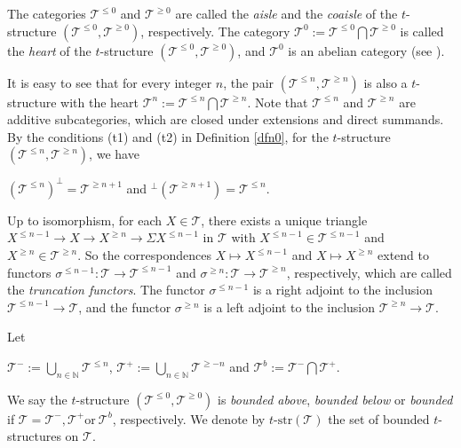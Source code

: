 \documentclass[11pt,a4paper]{amsart}
\numberwithin{equation}{section} \theoremstyle{plain}
\numberwithin{equation}{section} \theoremstyle{definition}
\begin{document}
The categories $\mathcal{T}^{\leq0}$ and $\mathcal{T}^{\geq0}$ are called the \emph{aisle} and the \emph{coaisle} of the $t$-structure $(\mathcal{T}^{\leq0},\mathcal{T}^{\geq0})$, respectively.  The category $\mathcal{T}^{0}:=\mathcal{T}^{\leq0}\bigcap\mathcal{T}^{\geq0}$ is called the \emph{heart} of the $t$-structure $(\mathcal{T}^{\leq0},\mathcal{T}^{\geq0})$, and $\mathcal{T}^{0}$ is an abelian category (see \cite[Theorem 1.3.6]{BBD}).

It is easy to see that for every integer $n$, the pair $(\mathcal{T}^{\leq n},\mathcal{T}^{\geq n})$ is also a $t$-structure with the heart $\mathcal{T}^{n}:=\mathcal{T}^{\leq n}\bigcap\mathcal{T}^{\geq n}$. Note that $\mathcal{T}^{\leq n}$ and $\mathcal{T}^{\geq n}$ are additive subcategories, which are closed under extensions and direct summands. By the conditions (t1) and (t2) in Definition \ref{dfn0}, for the $t$-structure $(\mathcal{T}^{\leq n},\mathcal{T}^{\geq n})$, we have
\begin{center}
$(\mathcal{T}^{\leq n})^{\perp}=\mathcal{T}^{\geq n+1}$ and ${^{\perp}(\mathcal{T}^{\geq n+1})}=\mathcal{T}^{\leq n}$.
\end{center}

Up to isomorphism, for each $X\in\mathcal{T}$, there exists a unique triangle $X^{\leq n-1}\rightarrow X\rightarrow X^{\geq n}\rightarrow \Sigma X^{\leq n-1}$ in $\mathcal{T}$ with $X^{\leq n-1}\in\mathcal{T}^{\leq n-1}$ and $X^{\geq n}\in\mathcal{T}^{\geq n}$. So the correspondences $X\mapsto X^{\leq n-1}$ and $X\mapsto X^{\geq n}$ extend to functors $\sigma^{\leq n-1}:\mathcal{T}\rightarrow\mathcal{T}^{\leq n-1}$ and $\sigma^{\geq n}:\mathcal{T}\rightarrow\mathcal{T}^{\geq n}$, respectively, which are called the \emph{truncation functors}. The functor $\sigma^{\leq n-1}$ is a right adjoint to the inclusion $\mathcal{T}^{\leq n-1}\rightarrow\mathcal{T}$, and the functor $\sigma^{\geq n}$ is a left adjoint to the inclusion $\mathcal{T}^{\geq n}\rightarrow\mathcal{T}$.


Let
\begin{center}
$\mathcal{T}^{-}:=\bigcup\limits_{n\in\mathbb{N}}\mathcal{T}^{\leq n}$, $\mathcal{T}^{+}:=\bigcup\limits_{n\in\mathbb{N}}\mathcal{T}^{\geq -n}$ and $\mathcal{T}^{b}:=\mathcal{T}^{-}\bigcap\mathcal{T}^{+}.$
\end{center}We say the $t$-structure $(\mathcal{T}^{\leq0},\mathcal{T}^{\geq0})$ is \emph{bounded above}, \emph{bounded below} or \emph{bounded} if $\mathcal{T}=\mathcal{T}^{-}, \mathcal{T}^{+} \mathrm{or}~\mathcal{T}^{b}$, respectively. We denote by $t$-$\mathrm{str}(\mathcal{T})$ the set of bounded $t$-structures on $\mathcal{T}$.
\end{document}
